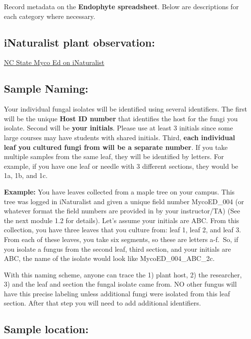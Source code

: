 \documentclass[
  letterpaper,
  DIV=11,
  numbers=noendperiod]{scrreprt}
\begin{document}
Record metadata on the \textbf{Endophyte spreadsheet}. Below are
descriptions for each category where necessary.

\subsection*{iNaturalist plant
observation:}\label{inaturalist-plant-observation}

\href{https://www.inaturalist.org/projects/nc-state-myco-ed}{NC State
Myco Ed on iNaturalist}

\subsection*{Sample Naming:}\label{sample-naming}

Your individual fungal isolates will be identified using several
identifiers. The first will be the unique \textbf{Host ID number} that
identifies the host for the fungi you isolate. Second will be
\textbf{your initials}. Please use at least 3 initials since some large
courses may have students with shared initials. Third, \textbf{each
individual leaf you cultured fungi from will be a separate number}. If
you take multiple samples from the same leaf, they will be identified by
letters. For example, if you have one leaf or needle with 3 different
sections, they would be 1a, 1b, and 1c.

\textbf{Example:} You have leaves collected from a maple tree on your
campus. This tree was logged in iNaturalist and given a unique field
number MycoED\_004 (or whatever format the field numbers are provided in
by your instructor/TA) (See the next module 1.2 for details). Let's
assume your initials are ABC. From this collection, you have three
leaves that you culture from: leaf 1, leaf 2, and leaf 3. From each of
these leaves, you take six segments, so these are letters a-f.~So, if
you isolate a fungus from the second leaf, third section, and your
initials are ABC, the name of the isolate would look like
MycoED\_004\_ABC\_2c.

With this naming scheme, anyone can trace the 1) plant host, 2) the
researcher, 3) and the leaf and section the fungal isolate came from. NO
other fungus will have this precise labeling unless additional fungi
were isolated from this leaf section. After that step you will need to
add additional identifiers.

\subsection*{Sample location:}\label{sample-location}
\end{document}
